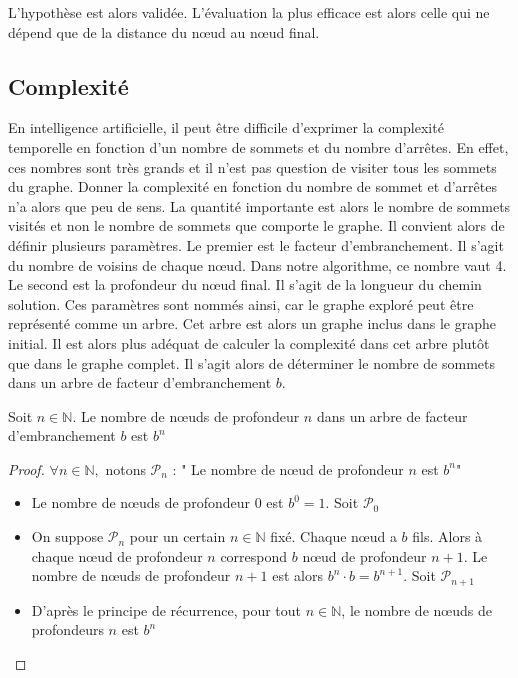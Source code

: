 L’hypothèse est alors validée. L’évaluation la plus efficace est alors celle qui ne dépend que de la distance du nœud au nœud final. 

\subsection{Complexité}

En intelligence artificielle, il peut être difficile d’exprimer la complexité temporelle en fonction d’un nombre de sommets et 
du nombre d’arrêtes. En effet, ces nombres sont très grands et il n’est pas question de visiter tous les sommets du graphe. 
Donner la complexité en fonction du nombre de sommet et d’arrêtes n’a alors que peu de sens. La quantité importante est alors 
le nombre de sommets visités et non le nombre de sommets que comporte le graphe.
Il convient alors de définir plusieurs paramètres. Le premier est le facteur d’embranchement. Il s’agit du nombre de voisins de 
chaque nœud. Dans notre algorithme, ce nombre vaut 4. Le second est la profondeur du nœud final. Il s’agit de la longueur du chemin 
solution.
Ces paramètres sont nommés ainsi, car le graphe exploré peut être représenté comme un arbre. Cet arbre est alors un graphe inclus 
dans le graphe initial.
Il est alors plus adéquat de calculer la complexité dans cet arbre plutôt que dans le graphe complet.
Il s’agit alors de déterminer le nombre de sommets dans un arbre de facteur d’embranchement $b$.

\begin{proposition}
    Soit $n \in \mathbb{N}$. Le nombre de nœuds de profondeur $n$ dans un arbre de facteur d'embranchement $b$ est $b^n$
\end{proposition}

\begin{proof}
    $\forall n \in \mathbb{N},$ notons $\mathcal{P}_n$ : " Le nombre de nœud de profondeur $n$ est $b^n$" \\
    \begin{itemize}
        \item Le nombre de nœuds de profondeur $0$ est $b^0=1$. Soit $\mathcal{P}_0$
        \item On suppose $\mathcal{P}_n$ pour un certain $n\in\mathbb{N}$ fixé. Chaque nœud a $b$ fils. Alors à chaque nœud de profondeur $n$ correspond $b$ nœud de profondeur $n+1$. Le nombre de nœuds de profondeur $n+1$ est alors $b^n\cdot b=b^{n+1}$. Soit $\mathcal{P}_{n+1}$
        \item D'après le principe de récurrence, pour tout $n \in \mathbb{N}$, le nombre de nœuds de profondeurs $n$ est $b^n$
    \end{itemize}
\end{proof}

